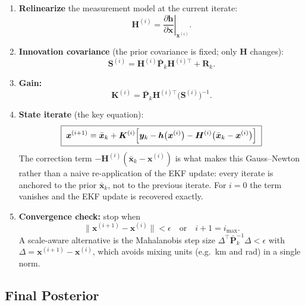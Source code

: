 \documentclass[11pt]{article}
\newcommand{\x}{\bm{x}}
\newcommand{\y}{\bm{y}}
\newcommand{\meas}{\bm{h}}
\newcommand{\Hm}{\bm{H}}
\newcommand{\K}{\bm{K}}
\newcommand{\Pm}{\bm{P}}
\newcommand{\R}{\bm{R}}
\newcommand{\Sm}{\bm{S}}
\newcommand{\xbar}{\bar{\x}}
\newcommand{\Pbar}{\bar{\Pm}}
\newcommand{\iter}[1]{^{(#1)}}
\begin{document}
\begin{enumerate}[label=\textbf{Step \arabic*.}, leftmargin=*, itemsep=1ex]
  \item \textbf{Relinearize} the measurement model at the current iterate:
  \begin{equation}
    \Hm\iter{i} = \left.\frac{\partial \meas}{\partial \x}\right|_{\x\iter{i}}.
  \end{equation}

  \item \textbf{Innovation covariance} (the prior covariance is fixed; only $\Hm$ changes):
  \begin{equation}
    \Sm\iter{i} = \Hm\iter{i}\Pbar_k\Hm^{(i)\top} + \R_k .
  \end{equation}

  \item \textbf{Gain:}
  \begin{equation}
    \K\iter{i} = \Pbar_k\Hm^{(i)\top}\bigl(\Sm\iter{i}\bigr)^{-1}.
  \end{equation}

  \item \textbf{State iterate} (the key equation):
  \begin{equation}
    \boxed{\;
      \x\iter{i+1} = \xbar_k + \K\iter{i}\Bigl[\y_k - \meas\bigl(\x\iter{i}\bigr)
                     - \Hm\iter{i}\bigl(\xbar_k - \x\iter{i}\bigr)\Bigr]
    \;}
    \label{eq:iekf-update}
  \end{equation}
  The correction term $-\Hm\iter{i}(\xbar_k - \x\iter{i})$ is what makes this Gauss--Newton
  rather than a naive re-application of the EKF update: every iterate is anchored to the prior
  $\xbar_k$, not to the previous iterate. For $i = 0$ the term vanishes and the EKF update is
  recovered exactly.

  \item \textbf{Convergence check:} stop when
  \begin{equation}
    \bigl\|\x\iter{i+1} - \x\iter{i}\bigr\| < \epsilon
    \quad\text{or}\quad i + 1 = i_{\max}.
  \end{equation}
  A scale-aware alternative is the Mahalanobis step size
  $\Delta^\top \Pbar_k^{-1} \Delta < \epsilon$ with $\Delta = \x\iter{i+1} - \x\iter{i}$,
  which avoids mixing units (e.g.\ km and rad) in a single norm.
\end{enumerate}

\subsection{Final Posterior}
\end{document}
